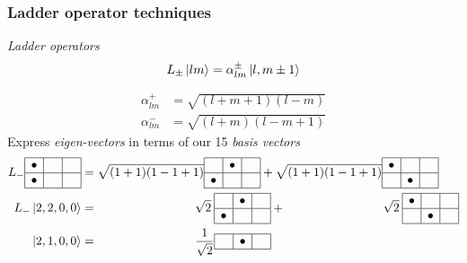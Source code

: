 \begin{frame}[t]
  \frametitle{Ladder operator techniques}
  \scriptsize
  \emph{Ladder operators}
  \[ L_\pm \Ket{lm} = \alpha_{lm}^\pm \Ket{l,m\pm1} \]
  
  \vspace{-2.5em}
  \begin{align*}
  \alpha_{lm}^+ & = \sqrt{(l+m+1)(l-m)} \\
  \alpha_{lm}^- & = \sqrt{(l+m)(l-m+1)}
  \end{align*}
  Express \emph{eigen-vectors} in terms of our 15 \emph{basis vectors}
  \begin{align*}
  L_-
  \begin{array}{|c|c|c|}
  \hline
  \bullet & \phantom{\bullet} & \phantom{\bullet} \\ \hline
  \bullet &  &  \\
  \hline
  \end{array} & =
  \sqrt{(1+1)(1-1+1)}
  \begin{array}{|c|c|c|}
  \hline
  \phantom{\bullet} & \bullet & \phantom{\bullet} \\ \hline
  \bullet &  &  \\
  \hline
  \end{array} +
  \sqrt{(1+1)(1-1+1)}
  \begin{array}{|c|c|c|}
  \hline
  \bullet & \phantom{\bullet} & \phantom{\bullet} \\ \hline
  & \bullet &  \\
  \hline
  \end{array} \nonumber \\
  L_-\Ket{2,2,0,0} & = \qquad \qquad \qquad \qquad
  \sqrt{2}\:
  \begin{array}{|c|c|c|}
  \hline
  \phantom{\bullet} & \bullet & \phantom{\bullet} \\ \hline
  \bullet &  &  \\
  \hline
  \end{array} + \qquad \qquad \qquad \qquad
  \sqrt{2}\:
  \begin{array}{|c|c|c|}
  \hline
  \bullet & \phantom{\bullet} & \phantom{\bullet} \\ \hline
  & \bullet &  \\
  \hline
  \end{array} \nonumber \\
  \Ket{2,1,0,0} & = \qquad \qquad \qquad \qquad
  \frac{1}{\sqrt{2}}
  \begin{array}{|c|c|c|}
  \hline
  \phantom{\bullet} & \bullet & \phantom{\bullet} \\ \hline

\end{array}
\end{align*}
\end{frame}
